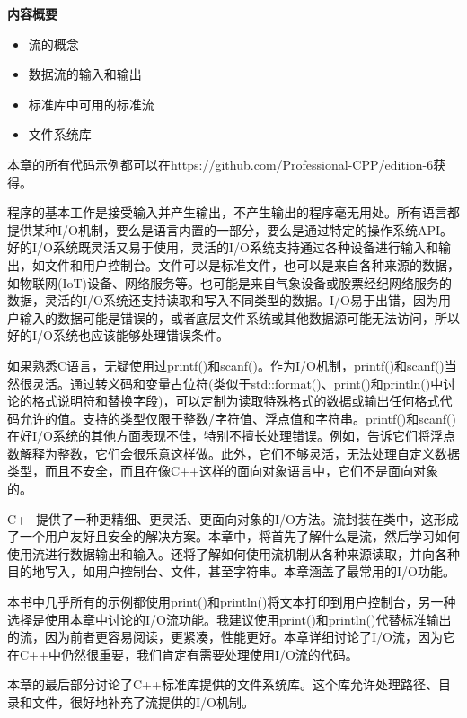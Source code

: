 \noindent
\textbf{内容概要}

\begin{itemize}
\item
流的概念

\item
数据流的输入和输出

\item
标准库中可用的标准流

\item
文件系统库
\end{itemize}

本章的所有代码示例都可以在\url{https://github.com/Professional-CPP/edition-6}获得。

程序的基本工作是接受输入并产生输出，不产生输出的程序毫无用处。所有语言都提供某种I/O机制，要么是语言内置的一部分，要么是通过特定的操作系统API。好的I/O系统既灵活又易于使用，灵活的I/O系统支持通过各种设备进行输入和输出，如文件和用户控制台。文件可以是标准文件，也可以是来自各种来源的数据，如物联网(IoT)设备、网络服务等。也可能是来自气象设备或股票经纪网络服务的数据，灵活的I/O系统还支持读取和写入不同类型的数据。I/O易于出错，因为用户输入的数据可能是错误的，或者底层文件系统或其他数据源可能无法访问，所以好的I/O系统也应该能够处理错误条件。

如果熟悉C语言，无疑使用过printf()和scanf()。作为I/O机制，printf()和scanf()当然很灵活。通过转义码和变量占位符(类似于std::format()、print()和println()中讨论的格式说明符和替换字段)，可以定制为读取特殊格式的数据或输出任何格式代码允许的值。支持的类型仅限于整数/字符值、浮点值和字符串。printf()和scanf()在好I/O系统的其他方面表现不佳，特别不擅长处理错误。例如，告诉它们将浮点数解释为整数，它们会很乐意这样做。此外，它们不够灵活，无法处理自定义数据类型，而且不安全，而且在像C++这样的面向对象语言中，它们不是面向对象的。

C++提供了一种更精细、更灵活、更面向对象的I/O方法。流封装在类中，这形成了一个用户友好且安全的解决方案。本章中，将首先了解什么是流，然后学习如何使用流进行数据输出和输入。还将了解如何使用流机制从各种来源读取，并向各种目的地写入，如用户控制台、文件，甚至字符串。本章涵盖了最常用的I/O功能。

本书中几乎所有的示例都使用print()和println()将文本打印到用户控制台，另一种选择是使用本章中讨论的I/O流功能。我建议使用print()和println()代替标准输出的流，因为前者更容易阅读，更紧凑，性能更好。本章详细讨论了I/O流，因为它在C++中仍然很重要，我们肯定有需要处理使用I/O流的代码。

本章的最后部分讨论了C++标准库提供的文件系统库。这个库允许处理路径、目录和文件，很好地补充了流提供的I/O机制。











